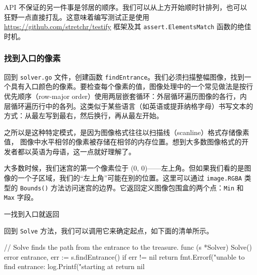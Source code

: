 API 不保证的另一件事是邻居的顺序。我们可以从上方开始顺时针排列，也可以狂野一点直接打乱。这意味着编写测试正是使用 \url{https://github.com/stretchr/testify} 框架及其 \texttt{assert.ElementsMatch} 函数的绝佳时机。

\subsubsection*{找到入口的像素}

回到 \texttt{solver.go} 文件，创建函数 \texttt{findEntrance}。我们必须扫描整幅图像，找到一个具有入口颜色的像素。要检查每个像素的值，图像处理中的一个常见做法是按行优先顺序（row-major order）使用两层嵌套循环：外层循环遍历图像的各行，内层循环遍历行中的各列。这类似于某些语言（如英语或提菲纳格字母）书写文本的方式：从最左写到最右，然后换行，再从最左开始。

之所以是这种特定模式，是因为图像格式往往以扫描线（scanline）格式存储像素值，
图像中水平相邻的像素被存储在相邻的内存位置。想到大多数图像格式的开发者都以英语为母语，这一点就好理解了。

大多数时候，我们迷宫的第一个像素位于 (0, 0)——左上角。但如果我们看的是图像的一个子区域，我们的``左上角''可能在别的位置。这里可以通过 \texttt{image.RGBA} 类型的 \texttt{Bounds()} 方法访问迷宫的边界。它返回定义图像包围盒的两个点：\texttt{Min} 和 \texttt{Max} 字段。


\begin{codeannotations}
\item 一找到入口就返回
\end{codeannotations}

回到 \texttt{Solve} 方法，我们可以调用它来确定起点，如下面的清单所示。

\begin{gocode}[title={代码清单 9.12 \texttt{solver.go}：在 \texttt{Solve} 中调用 \texttt{findEntrance}}]
// Solve finds the path from the entrance to the treasure.
func (s *Solver) Solve() error {
    entrance, err := s.findEntrance()
    if err != nil {
        return fmt.Errorf("unable to find entrance: %
    }
    log.Printf("starting at %
    return nil
}
\end{gocode}

